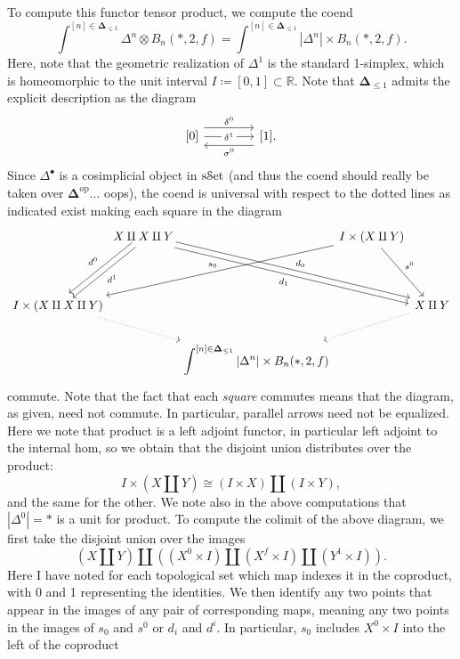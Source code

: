 To compute this functor tensor product, we compute the coend
\[
	\int^{[n]\in \boldsymbol{\Delta}_{\leq 1}} \Delta^{n} \otimes B_n(*,2,f)=\int^{[n]\in\boldsymbol{\Delta}_{\leq 1}  } \left| \Delta^n \right| \times B_n(*,2,f)
.\]
Here, note that the geometric realization of $\Delta^1$ is the standard 1-simplex, which is homeomorphic to the unit interval $I\coloneqq [0,1]\subset\mathbb{R}$. Note that $\boldsymbol{\Delta} _{\leq 1} $ admits the explicit description as the diagram
\[\begin{tikzcd}[column sep=4em]
	{[0]} & {[1].}
	\arrow["{\delta^1}"{description}, from=1-1, to=1-2]
	\arrow["{\delta^0}", shift left=3, from=1-1, to=1-2]
	\arrow["{\sigma^0}", shift left=3, from=1-2, to=1-1]
\end{tikzcd}\]
Since $\Delta^{\bullet} $ is a cosimplicial object in $\mathrm{s}\mathcal{S}\mathrm{et}$ (and thus the coend should really be taken over $\boldsymbol{\Delta} ^{\mathrm{op}} $... oops), the coend is universal with respect to the dotted lines as indicated exist making each square in the diagram
\[\begin{tikzcd}[row sep=2em, column sep=0em]
	& {X\amalg X\amalg Y} && {I\times(X\amalg Y)} \\
	\\
	{I\times(X\amalg X\amalg Y)} &&&& {X\amalg Y} \\
	&& {\displaystyle{\int^{[n]\in\boldsymbol{\Delta}_{\leq 1} }}\left|\Delta^n\right|\times B_n(*,2,f)}
	\arrow["{d^0}"', shift right, from=1-2, to=3-1]
	\arrow["{d^1}", shift left, from=1-2, to=3-1]
	\arrow["{d_0}", shift left, from=1-2, to=3-5]
	\arrow["{d_1}"', shift right, from=1-2, to=3-5]
	\arrow["{s_0}"', from=1-4, to=3-1]
	\arrow["{s^0}", from=1-4, to=3-5]
	\arrow[dotted, from=3-1, to=4-3]
	\arrow[dotted, from=3-5, to=4-3]
\end{tikzcd}\]
commute. Note that the fact that each \emph{square} commutes means that the diagram, as given, need not commute. In particular, parallel arrows need not be equalized. Here we note that product is a left adjoint functor, in particular left adjoint to the internal hom, so we obtain that the disjoint union distributes over the product:
\[
	I\times (X\amalg Y)\cong (I\times X)\amalg (I\times Y),
\]
and the same for the other. We note also in the above computations that $\left| \Delta^0 \right| =*$ is a unit for product. To compute the colimit of the above diagram, we first take the disjoint union over the images
\[
	(X\amalg Y)\amalg ((X^0\times I)\amalg (X^f\times I)\amalg (Y^1\times I))
.\]
Here I have noted for each topological set which map indexes it in the coproduct, with 0 and 1 representing the identities. We then identify any two points that appear in the images of any pair of corresponding maps, meaning any two points in the images of $s_0$ and $s^0$ or $d_i$ and $d^i$. In particular, $s_0$ includes $X^0\times I$ into the left of the coproduct
